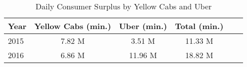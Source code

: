 \begin{table}[h]
\caption{Daily Consumer Surplus by Yellow Cabs and Uber}\label{tab:welfare_waittime}\\

{
\def\sym#1{\ifmmode^{#1}\else\(^{#1}\)\fi}
\begin{center}
\begin{tabular}{l*{5}{c}}
\hline\hline
Year & Yellow Cabs (min.) & Uber (min.) & Total (min.)\\
\hline
 2015 & 7.82 M & 3.51 M & 11.33 M\\
 2016 & 6.86 M & 11.96 M & 18.82 M\\

 
 


\hline\hline
\end{tabular}
\end{center}
}


\end{table}
